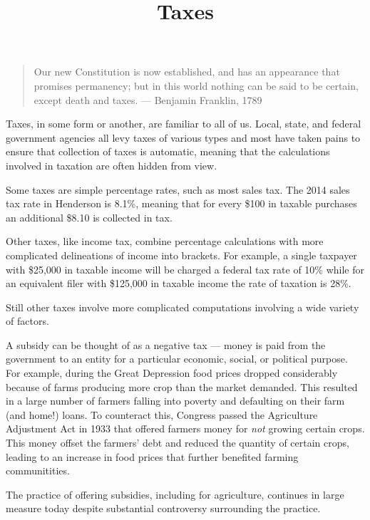\documentclass{ximera}
\title{Taxes}
\begin{document}
\begin{abstract}

\end{abstract}
\maketitle
\begin{quote}
Our new Constitution is now established, and has an appearance that promises permanency; but in this world nothing can be said to be certain, except death and taxes. --- Benjamin Franklin, 1789
\end{quote}

Taxes, in some form or another, are familiar to all of us. Local, state, and federal government agencies all levy taxes of various types and most have taken pains to ensure that collection of taxes is automatic, meaning that the calculations involved in taxation are often hidden from view.

Some taxes are simple percentage rates, such as most sales tax. The 2014 sales tax rate in Henderson is 8.1\%, meaning that for every \$100 in taxable purchases an additional \$8.10 is collected in tax.

Other taxes, like income tax, combine percentage calculations with more complicated delineations of income into brackets. For example, a single taxpayer with \$25,000 in taxable income will be charged a federal tax rate of 10\% while for an equivalent filer with \$125,000 in taxable income the rate of taxation is 28\%.

Still other taxes involve more complicated computations involving a wide variety of factors. 

A subsidy can be thought of as a negative tax --- money is paid from the government to an entity for a particular economic, social, or political purpose. For example, during the Great Depression food prices dropped considerably because of farms producing more crop than the market demanded. This resulted in a large number of farmers falling into poverty and defaulting on their farm (and home!) loans. To counteract this, Congress passed the Agriculture Adjustment Act in 1933 that offered farmers money for \emph{not} growing certain crops. This money offset the farmers' debt and reduced the quantity of certain crops, leading to an increase in food prices that further benefited farming communitities.

The practice of offering subsidies, including for agriculture, continues in large measure today despite substantial controversy surrounding the practice.
\end{document}

